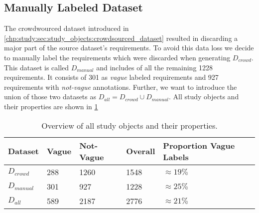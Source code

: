 \subsection{Manually Labeled Dataset}
\label{chp:study:sec:study_objects:dataset_creation:manual_labeling}
The crowdwourced dataset introduced in \cref{chp:study:sec:study_objects:crowdsourced_dataset} resulted in discarding a major part of the source dataset's requirements.
To avoid this data loss we decide to manually label the requirements which were discarded when generating $D_{crowd}$.
This dataset is called $D_{manual}$ and includes of all the remaining 1228 requirements.
It consists of 301 as \textit{vague} labeled requirements and 927 requirements with \textit{not-vague} annotations.
Further, we want to introduce the union of those two datasets as $D_{all} = D_{crowd} \cup D_{manual}$.
All study objects and their properties are shown in \cref{tab:study:objects:all_datasets}

\begin{table}[htpb]
    \centering
    \begin{tabular}{l l l l l}
        \toprule
        Dataset & Vague & Not-Vague & Overall & Proportion Vague Labels \\
        \midrule
        $D_{crowd}$ & 288 & 1260 & 1548 & $\approx19\%$\\
        $D_{manual}$ & 301 & 927 & 1228 & $\approx25\%$\\
        \midrule
        $D_{all}$ & 589 & 2187 & 2776 &  $\approx21\%$\\
        \bottomrule
    \end{tabular}
    \caption[Overview of all study objects]{Overview of all study objects and their properties.}\label{tab:study:objects:all_datasets}
\end{table}
